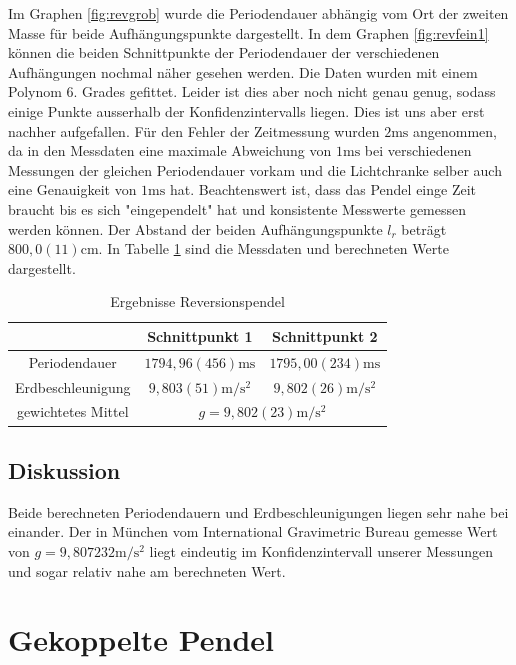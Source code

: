 \documentclass[11pt, a4paper]{article}
\begin{document}
    Im Graphen \ref{fig:revgrob} wurde die Periodendauer abhängig vom Ort der zweiten Masse für beide Aufhängungspunkte dargestellt. 
    In dem Graphen \ref{fig:revfein1}  können die beiden Schnittpunkte der Periodendauer der verschiedenen
    Aufhängungen nochmal näher gesehen werden. Die Daten wurden mit einem Polynom 6. Grades gefittet.
    Leider ist dies aber noch nicht genau genug, sodass einige Punkte ausserhalb
    der Konfidenzintervalls liegen. Dies ist uns aber erst nachher aufgefallen. Für den Fehler der Zeitmessung
    wurden $2 \si{\milli\second}$ angenommen, da in den Messdaten eine maximale Abweichung von $1\si{\milli\second}$ bei verschiedenen Messungen 
    der gleichen Periodendauer vorkam und die Lichtchranke selber auch eine Genauigkeit von $1\si{\milli\second}$ hat.
    Beachtenswert ist, dass das Pendel einge Zeit braucht bis es sich "eingependelt" hat und konsistente Messwerte
    gemessen werden können. Der Abstand der beiden Aufhängungspunkte $l_r$ beträgt $800,0(11)\si{\centi\metre}$.
    In Tabelle \ref{ergrev} sind die Messdaten und berechneten Werte dargestellt. 

    \begin{table}[H]
        \centering
        \begin{tabular}{c c c}
            & Schnittpunkt 1 & Schnittpunkt 2 \\ \hline
            Periodendauer &  $1794,96(456)\si{\milli\second} $ & $1795,00(234)\si{\milli\second} $ \\
            Erdbeschleunigung & $9,803(51)\si{\metre\per\second\squared}$ & $9,802(26)\si{\metre\per\second\squared}$ \\
            gewichtetes Mittel & \multicolumn{2}{c}{$g = 9,802(23)\si{\metre\per\square\second}$}
        \end{tabular}
        \caption{Ergebnisse Reversionspendel}
        \label{ergrev}
    \end{table}

    \subsection{Diskussion}
    Beide berechneten Periodendauern und Erdbeschleunigungen liegen sehr nahe bei einander.
    Der in München vom International Gravimetric Bureau gemesse Wert von $g = 9,807232\si{\metre\per\second\squared}$ \cite{glit} liegt
    eindeutig im Konfidenzintervall unserer Messungen und sogar relativ nahe am berechneten Wert.


    \section{Gekoppelte Pendel}
\end{document}
